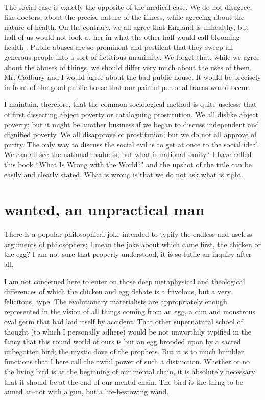 \documentclass[final,10pt,letterpaper,twocolumn,openany]{book}
\begin{document}
The social case is exactly the opposite of the medical case.
We do not disagree, like doctors, about the precise nature of the illness,
while agreeing about the nature of health. On the contrary, we all agree
that England is unhealthy, but half of us would not look at her in what the
other half would call blooming health . Public abuses are so prominent and
pestilent that they sweep all generous people into a sort of fictitious
unanimity. We forget that, while we agree about the abuses of things, we
should differ very much about the uses of them. Mr. Cadbury and I would
agree about the bad public house. It would be precisely in front of the
good public-house that our painful personal fracas would occur.

I maintain, therefore, that the common sociological method is quite
useless: that of first dissecting abject poverty or cataloguing prostitution.
We all dislike abject poverty; but it might be another business if we began
to discuss independent and dignified poverty. We all disapprove of
prostitution; but we do not all approve of purity. The only way to discuss
the social evil is to get at once to the social ideal. We can all see the
national madness; but what is national sanity? I have called this book
``What Is Wrong with the World?" and the upshot of the title can be easily
and clearly stated. What is wrong is that we do not ask what is right.

\section{wanted, an unpractical man}

There is a popular philosophical joke intended to typify the endless
and useless arguments of philosophers; I mean the joke about which came
first, the chicken or the egg? I am not sure that properly understood, it is
so futile an inquiry after all. 

I am not concerned here to enter on those
deep metaphysical and theological differences of which the chicken and
egg debate is a frivolous, but a very felicitous, type. The evolutionary
materialists are appropriately enough represented in the vision of all things
coming from an egg, a dim and monstrous oval germ that had laid itself by
accident. That other supernatural school of thought (to which I personally
adhere) would be not unworthily typified in the fancy that this round
world of ours is but an egg brooded upon by a sacred unbegotten bird; the
mystic dove of the prophets. But it is to much humbler functions that I
here call the awful power of such a distinction. Whether or no the living
bird is at the beginning of our mental chain, it is absolutely necessary that
it should be at the end of our mental chain. The bird is the thing to be
aimed at--not with a gun, but a life-bestowing wand. 
\end{document}
